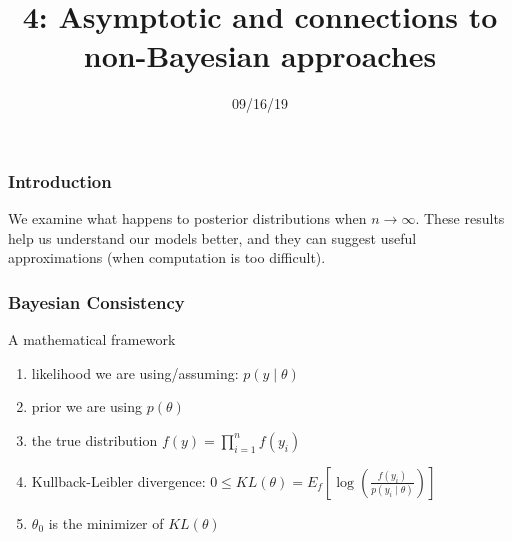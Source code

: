 \documentclass{beamer}
\title["4"]{4: Asymptotic and connections to non-Bayesian approaches}
\date{09/16/19}
\begin{document}

\begin{frame}
\titlepage 
\end{frame}

\begin{frame}
\frametitle{Introduction}

We examine what happens to posterior distributions when $n \to \infty$. These results help us understand our models better, and they can suggest useful approximations (when computation is too difficult).
\newline


\end{frame}
\begin{frame}
\frametitle{Bayesian Consistency}

A mathematical framework
\begin{enumerate}
\item likelihood we are using/assuming: $p(y \mid \theta)$
\item prior we are using $p(\theta)$
\item the true distribution $f(y) = \prod_{i=1}^n f(y_i)$
\item Kullback-Leibler divergence: $0 \le KL(\theta) = E_f\left[\log\left(\frac{ f(y_i) }{p(y_i \mid \theta) } \right) \right]$
\item $\theta_0$ is the minimizer of $KL(\theta)$
\end{enumerate}

\end{frame}
\end{document}
